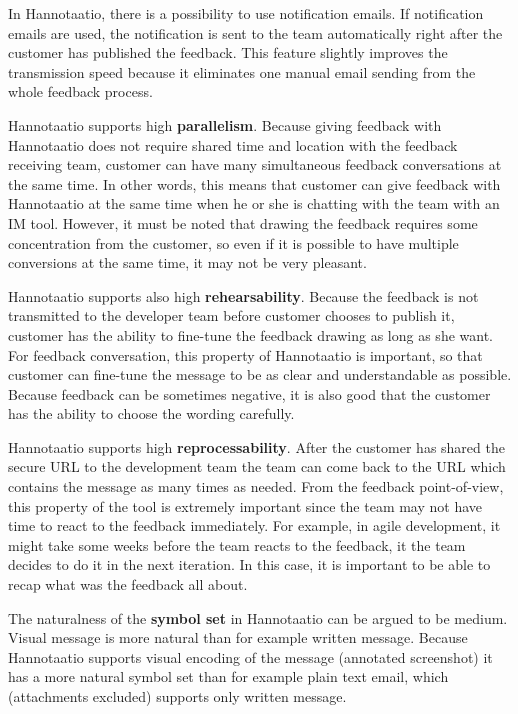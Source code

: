 \documentclass[english,12pt,a4paper,pdftex]{article}
\begin{document}
In Hannotaatio, there is a possibility to use notification emails. If notification emails are used, the notification is sent to the team automatically right after the customer has published the feedback. This feature slightly improves the transmission speed because it eliminates one manual email sending from the whole feedback process.

Hannotaatio supports high \textbf{parallelism}. Because giving feedback with Hannotaatio does not require shared time and location with the feedback receiving team, customer can have many simultaneous feedback conversations at the same time. In other words, this means that customer can give feedback with Hannotaatio at the same time when he or she is chatting with the team with an \ac{IM} tool. However, it must be noted that drawing the feedback requires some concentration from the customer, so even if it is possible to have multiple conversions at the same time, it may not be very pleasant.

Hannotaatio supports also high \textbf{rehearsability}. Because the feedback is not transmitted to the developer team before customer chooses to publish it, customer has the ability to fine-tune the feedback drawing as long as she want. For feedback conversation, this property of Hannotaatio is important, so that customer can fine-tune the message to be as clear and understandable as possible. Because feedback can be sometimes negative, it is also good that the customer has the ability to choose the wording carefully.

Hannotaatio supports high \textbf{reprocessability}. After the customer has shared the secure \ac{URL} to the development team the team can come back to the \ac{URL} which contains the message as many times as needed. From the feedback point-of-view, this property of the tool is extremely important since the team may not have time to react to the feedback immediately. For example, in agile development, it might take some weeks before the team reacts to the feedback, it the team decides to do it in the next iteration. In this case, it is important to be able to recap what was the feedback all about.

The naturalness of the \textbf{symbol set} in Hannotaatio can be argued to be medium. Visual message is more natural than for example written message. Because Hannotaatio supports visual encoding of the message (annotated screenshot) it has a more natural symbol set than for example plain text email, which (attachments excluded) supports only written message.
\end{document}
